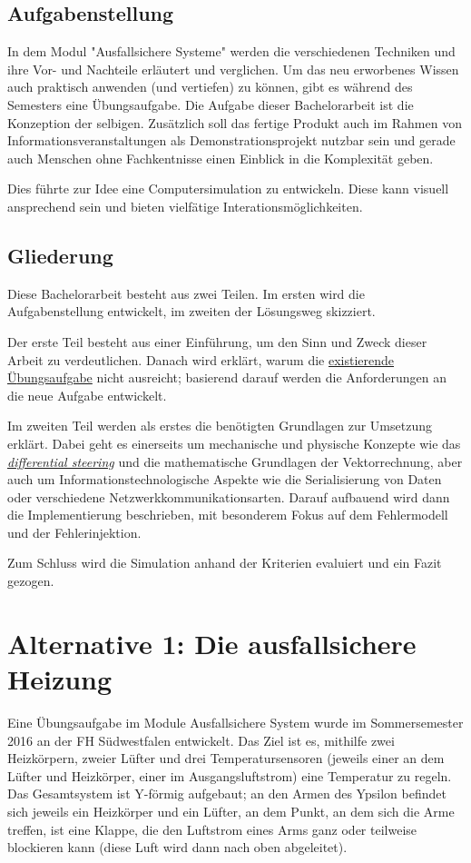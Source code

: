 \subsection{Aufgabenstellung} In dem Modul "Ausfallsichere Systeme" werden die verschiedenen Techniken und ihre Vor- und Nachteile
erl{\"{a}}utert und verglichen. Um das neu erworbenes Wissen auch praktisch anwenden (und vertiefen) zu k{\"{o}}nnen, gibt es w{\"{a}}hrend des Semesters eine {\"{U}}bungsaufgabe.
Die Aufgabe dieser Bachelorarbeit ist die Konzeption der selbigen. Zus{\"{a}}tzlich soll das fertige Produkt auch im Rahmen von Informationsveranstaltungen als Demonstrationsprojekt
nutzbar sein und gerade auch Menschen ohne Fachkentnisse einen Einblick in die Komplexit{\"{a}}t geben.

Dies f{\"{u}}hrte zur Idee eine Computersimulation zu entwickeln. Diese kann visuell ansprechend sein und bieten vielf{\"{a}}tige Interationsm{\"{o}}glichkeiten.

\subsection{Gliederung} Diese Bachelorarbeit besteht aus zwei Teilen. Im ersten wird die Aufgabenstellung entwickelt, im zweiten der L{\"{o}}sungsweg skizziert.

Der erste Teil besteht aus einer Einf{\"{u}}hrung, um den Sinn und Zweck dieser Arbeit zu verdeutlichen. Danach wird erkl{\"{a}}rt, warum die
\hyperref[heizung]{existierende {\"{U}}bungsaufgabe} nicht ausreicht; basierend darauf werden die Anforderungen an die neue Aufgabe entwickelt.

Im zweiten Teil werden als erstes die ben{\"{o}}tigten Grundlagen zur Umsetzung erkl{\"{a}}rt. Dabei geht es einerseits um mechanische und physische Konzepte wie das
\hyperref[diffs]{\textit{differential steering}} und die mathematische Grundlagen der Vektorrechnung, aber auch um Informationstechnologische Aspekte wie die Serialisierung von Daten oder
verschiedene Netzwerkkommunikationsarten. Darauf aufbauend wird dann die Implementierung beschrieben, mit besonderem Fokus auf dem Fehlermodell und der
Fehlerinjektion.

Zum Schluss wird die Simulation anhand der Kriterien evaluiert und ein Fazit gezogen.

\clearpage
\section{Alternative 1: Die ausfallsichere Heizung}\label{heizung}
Eine {\"{U}}bungsaufgabe im Module Ausfallsichere System wurde im Sommersemester 2016 an der FH S{\"{u}}dwestfalen entwickelt. Das Ziel ist es, mithilfe zwei Heizk{\"{o}}rpern, zweier
L{\"{u}}fter und drei Temperatursensoren (jeweils einer an dem L{\"{u}}fter und Heizk{\"{o}}rper, einer im Ausgangsluftstrom) eine Temperatur zu regeln.
Das Gesamtsystem ist Y-f{\"{o}}rmig aufgebaut; an den Armen des Ypsilon befindet sich jeweils ein Heizk{\"{o}}rper und ein L{\"{u}}fter, an dem Punkt, an dem sich
die Arme treffen, ist eine Klappe, die den Luftstrom eines Arms ganz oder teilweise blockieren kann (diese Luft wird dann nach oben abgeleitet).


